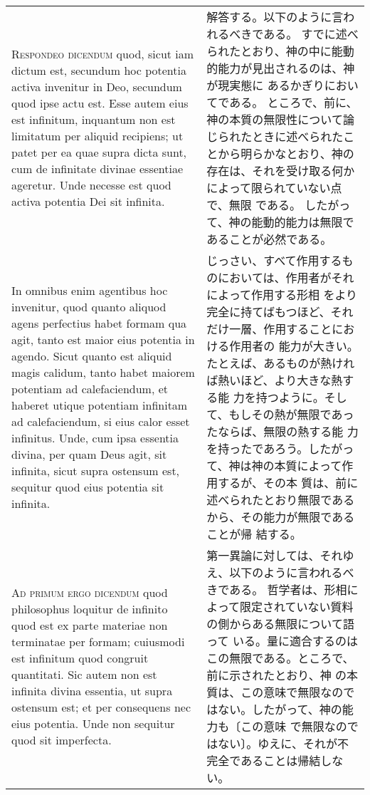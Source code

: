 \documentclass[10pt]{jsarticle} %
\begin{document}
\begin{longtable}{p{21em}p{21em}}
\\


{\scshape Respondeo dicendum} quod, sicut iam dictum est, secundum hoc
 potentia activa invenitur in Deo, secundum quod ipse actu est. Esse
 autem eius est infinitum, inquantum non est limitatum per aliquid
 recipiens; ut patet per ea quae supra dicta sunt, cum de infinitate
 divinae essentiae ageretur. Unde necesse est quod activa potentia Dei
 sit infinita. 


&


解答する。以下のように言われるべきである。
すでに述べられたとおり、神の中に能動的能力が見出されるのは、神が現実態に
 あるかぎりにおいてである。
ところで、前に、神の本質の無限性について論じられたときに述べられたことから明らかなとおり、神の存在は、それを受け取る何かによって限られていない点で、無限
 である。
したがって、神の能動的能力は無限であることが必然である。



\\

In omnibus enim agentibus hoc invenitur, quod quanto
 aliquod agens perfectius habet formam qua agit, tanto est maior eius
 potentia in agendo. Sicut quanto est aliquid magis calidum, tanto habet
 maiorem potentiam ad calefaciendum, et haberet utique potentiam
 infinitam ad calefaciendum, si eius calor esset infinitus. Unde, cum
 ipsa essentia divina, per quam Deus agit, sit infinita, sicut supra
 ostensum est, sequitur quod eius potentia sit infinita.


&

じっさい、すべて作用するものにおいては、作用者がそれによって作用する形相
 をより完全に持てばもつほど、それだけ一層、作用することにおける作用者の
 能力が大きい。たとえば、あるものが熱ければ熱いほど、より大きな熱する能
 力を持つように。そして、もしその熱が無限であったならば、無限の熱する能
 力を持ったであろう。したがって、神は神の本質によって作用するが、その本
 質は、前に述べられたとおり無限であるから、その能力が無限であることが帰
 結する。


\\


{\scshape Ad primum ergo dicendum} quod philosophus loquitur de infinito
 quod est ex parte materiae non terminatae per formam; cuiusmodi est
 infinitum quod congruit quantitati. Sic autem non est infinita divina
 essentia, ut supra ostensum est; et per consequens nec eius
 potentia. Unde non sequitur quod sit imperfecta.


&

第一異論に対しては、それゆえ、以下のように言われるべきである。
哲学者は、形相によって限定されていない質料の側からある無限について語って
 いる。量に適合するのはこの無限である。ところで、前に示されたとおり、神
 の本質は、この意味で無限なのではない。したがって、神の能力も〔この意味
 で無限なのではない〕。ゆえに、それが不完全であることは帰結しない。



\end{longtable}
\end{document}
